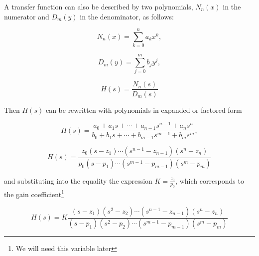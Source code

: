 \documentclass[a4paper, 10pt, final]{article} %
\begin{document}
    \noindent A transfer function can also be described by two polynomials, $N_n(x)$ in the numerator and $D_m(y)$ in the denominator, as follows:
    \begin{figure}[H]
        \centering
        \begin{minipage}[b]{.3\linewidth}
            \centering
            \[
                N_n(x) = \sum^{n}_{k=0} a_k x^k \mathrm{,}
            \]
        \end{minipage}
        \begin{minipage}[b]{.3\linewidth}
            \centering
            \[
                D_m(y) = \sum^{m}_{j=0} b_j y^j \mathrm{,}
            \]
        \end{minipage}
        \begin{minipage}[b]{.3\linewidth}
            \centering
            \[
                H(s) = \frac{N_n(s)}{D_m(s)}
            \]
        \end{minipage}
    \end{figure}
    \noindent Then $H(s)$ can be rewritten with polynomials in expanded or factored form
    \begin{figure}[H]
        \centering
        \begin{minipage}[b]{.45\linewidth}
            \centering
            \[
                H(s) = \frac{a_0 + a_1 s + \dotsm + a_{n-1} s^{n-1} + a_n s^n}{b_0 + b_1 s + \dotsm + b_{m-1} s^{m-1} + b_m s^m} \mathrm{,}
            \]
        \end{minipage}
        \hspace{0.04\linewidth}
        \begin{minipage}[b]{.45\linewidth}
            \centering
            \[
                H(s) = \frac{z_0 \left(s - z_1\right) \dotsm \left(s^{n-1} - z_{n-1}\right) \left(s^n - z_n\right)}{p_0 \left(s - p_1\right) \dotsm \left(s^{m-1} - p_{m-1}\right) \left(s^m - p_m\right)}
            \]
        \end{minipage}
    \end{figure}
    \noindent and substituting into the equality the expression $K = \frac{z_0}{p_0}$, which corresponds to the gain coefficient\footnote{We will need this variable later} 
    \begin{figure}[H]
        \centering
        \[
            H(s) = K \frac{\left(s - z_1\right) \left(s^2 - z_2\right) \dotsm \left(s^{n-1} - z_{n-1}\right) \left(s^n - z_n\right)}{\left(s - p_1\right) \left(s^2 - p_2\right) \dotsm \left(s^{m-1} - p_{m-1}\right) \left(s^m - p_m\right)}
        \]
    \end{figure}
\end{document}
